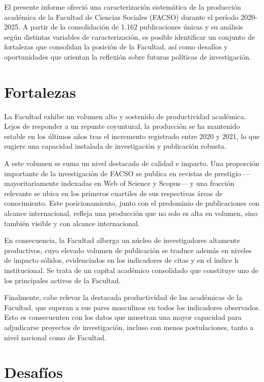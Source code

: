 \documentclass[
  a4paper,
  oneside]{scrbook}
\begin{document}
El presente informe ofreció una caracterización sistemática de la
producción académica de la Facultad de Ciencias Sociales (FACSO) durante
el período 2020-2025. A partir de la consolidación de 1.162
publicaciones únicas y su análisis según distintas variables de
caracterización, es posible identificar un conjunto de fortalezas que
consolidan la posición de la Facultad, así como desafíos y oportunidades
que orientan la reflexión sobre futuras políticas de investigación.

\section{Fortalezas}\label{fortalezas-1}

La Facultad exhibe un volumen alto y sostenido de productividad
académica. Lejos de responder a un repunte coyuntural, la producción se
ha mantenido estable en los últimos años tras el incremento registrado
entre 2020 y 2021, lo que sugiere una capacidad instalada de
investigación y publicación robusta.

A este volumen se suma un nivel destacado de calidad e impacto. Una
proporción importante de la investigación de FACSO se publica en
revistas de prestigio ---mayoritariamente indexadas en Web of Science y
Scopus--- y una fracción relevante se ubica en los primeros cuartiles de
sus respectivas áreas de conocimiento. Este posicionamiento, junto con
el predominio de publicaciones con alcance internacional, refleja una
producción que no solo es alta en volumen, sino también visible y con
alcance internacional.

En consecuencia, la Facultad alberga un núcleo de investigadores
altamente productivos, cuyo elevado volumen de publicación se traduce
además en niveles de impacto sólidos, evidenciados en los indicadores de
citas y en el índice h institucional. Se trata de un capital académico
consolidado que constituye uno de los principales activos de la
Facultad.

Finalmente, cabe relevar la destacada productividad de las académicas de
la Facultad, que superan a sus pares masculinos en todos los indicadores
observados. Esto es consecuenten con los datos que muestran una mayor
capacidad para adjudicarse proyectos de investigación, incluso con menos
postulaciones, tanto a nivel nacional como de Facultad.

\section{Desafíos}\label{desafuxedos-1}
\end{document}
